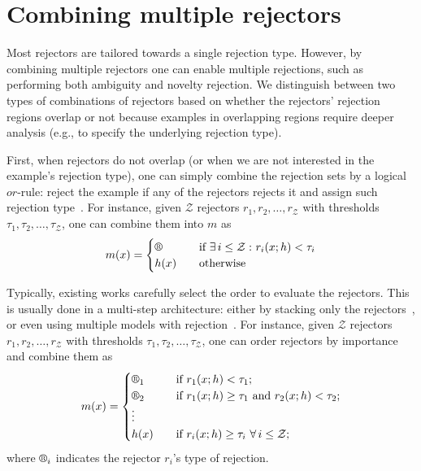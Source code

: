 \section{Combining multiple rejectors}\label{sec:combining_rejectors}

Most rejectors are tailored towards a single rejection type. However, by combining multiple rejectors one can enable multiple rejections, such as performing both ambiguity and novelty rejection. We distinguish between two types of combinations of rejectors based on whether the rejectors' rejection regions overlap or not because examples in overlapping regions require deeper analysis (e.g., to specify the underlying rejection type). 

First, when rejectors do not overlap (or when we are not interested in the example's rejection type), one can simply combine the rejection sets by a logical $or$-rule: reject the example if any of the rejectors rejects it and assign such rejection type~\citep{Frelicot1997,Suutala2004}. For instance, given $\mathcal{Z}$ rejectors $r_1, r_2, \dots, r_{\mathcal{Z}}$ with thresholds $\tau_1, \tau_2, \dots, \tau_{\mathcal{Z}}$, one can combine them into $m$ as
\begin{equation*}
    m(x) =
    \begin{cases}
        \rr{} \quad &\text{if } \exists \, i \le \mathcal{Z} \, \colon r_i(x; h)<\tau_i \\
        h(x)  \quad &\text{otherwise}
    \end{cases}
\end{equation*}

 Typically, existing works carefully select the order to evaluate the rejectors. This is usually done in a multi-step architecture: either by stacking only the rejectors~\citep{Frelicot1998,Frelicot2002}, or even using multiple models with rejection~\citep{Pudil1992,Barandas2022}. For instance, given $\mathcal{Z}$ rejectors $r_1, r_2, \dots, r_{\mathcal{Z}}$ with thresholds $\tau_1, \tau_2, \dots, \tau_{\mathcal{Z}}$, one can order rejectors by importance and combine them as
\begin{equation*}
    m(x) =
    \begin{cases}
        \rr{}_1 \quad &\text{if } r_1(x; h)<\tau_1; \\
        \rr{}_2 \quad &\text{if } r_1(x; h)\ge \tau_1 \text{ and } r_2(x; h)<\tau_2; \\
        \vdots \\
        h(x)  \quad &\text{if } r_i(x; h)\ge \tau_i \ \forall \, i \le \mathcal{Z}; \\
    \end{cases}
\end{equation*}
where $\rr{}_i$ indicates the rejector $r_i$'s type of rejection.

